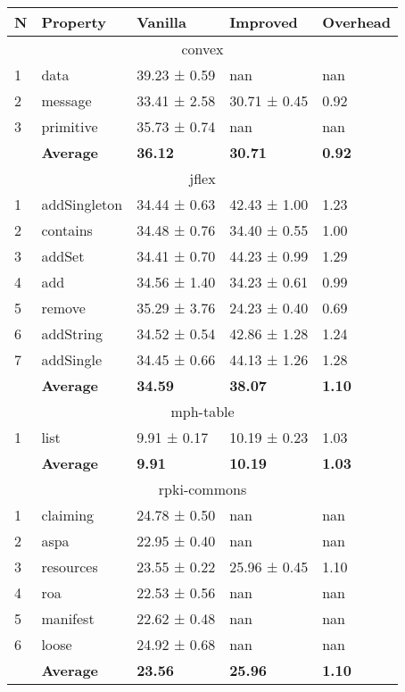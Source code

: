 \begin{tabular}{lllll}
N & Property & Vanilla & Improved & Overhead \\
\hline
\multicolumn{5}{c}{convex} \\
\hline
1 & data & 39.23 ± 0.59 & nan & nan \\
2 & message & 33.41 ± 2.58 & 30.71 ± 0.45 & 0.92 \\
3 & primitive & 35.73 ± 0.74 & nan & nan \\
\textbf{} & \textbf{Average} & \textbf{36.12} & \textbf{30.71} & \textbf{0.92} \\
\hline
\multicolumn{5}{c}{jflex} \\
\hline
1 & addSingleton & 34.44 ± 0.63 & 42.43 ± 1.00 & 1.23 \\
2 & contains & 34.48 ± 0.76 & 34.40 ± 0.55 & 1.00 \\
3 & addSet & 34.41 ± 0.70 & 44.23 ± 0.99 & 1.29 \\
4 & add & 34.56 ± 1.40 & 34.23 ± 0.61 & 0.99 \\
5 & remove & 35.29 ± 3.76 & 24.23 ± 0.40 & 0.69 \\
6 & addString & 34.52 ± 0.54 & 42.86 ± 1.28 & 1.24 \\
7 & addSingle & 34.45 ± 0.66 & 44.13 ± 1.26 & 1.28 \\
\textbf{} & \textbf{Average} & \textbf{34.59} & \textbf{38.07} & \textbf{1.10} \\
\hline
\multicolumn{5}{c}{mph-table} \\
\hline
1 & list & 9.91 ± 0.17 & 10.19 ± 0.23 & 1.03 \\
\textbf{} & \textbf{Average} & \textbf{9.91} & \textbf{10.19} & \textbf{1.03} \\
\hline
\multicolumn{5}{c}{rpki-commons} \\
\hline
1 & claiming & 24.78 ± 0.50 & nan & nan \\
2 & aspa & 22.95 ± 0.40 & nan & nan \\
3 & resources & 23.55 ± 0.22 & 25.96 ± 0.45 & 1.10 \\
4 & roa & 22.53 ± 0.56 & nan & nan \\
5 & manifest & 22.62 ± 0.48 & nan & nan \\
6 & loose & 24.92 ± 0.68 & nan & nan \\
\textbf{} & \textbf{Average} & \textbf{23.56} & \textbf{25.96} & \textbf{1.10} \\
\end{tabular}
